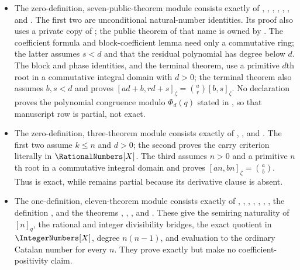 \documentclass[11pt,a4paper,oneside,openany]{book}
\theoremstyle{definition}
\theoremstyle{remark}
\newcommand{\statusexact}{\textsf{\color{statusgreen}exact}}
\newcommand{\statuspartial}{\textsf{\color{statusamber}partial}}
\begin{document}
\begin{itemize}
\item The zero-definition, seven-public-theorem module 
consists exactly of ,
,
,
,
,
, and
.  The first two are unconditional
natural-number identities.  Its proof also uses a private copy of
; the public theorem of that name is owned by
.  The coefficient formula and block-coefficient
lemma need only a commutative ring; the latter assumes $s<d$ and that the
residual polynomial has degree below $d$.  The block and phase identities,
and the terminal theorem, use a primitive $d$th root in a commutative
integral domain with $d>0$; the terminal theorem also assumes $b,s<d$ and
proves
$[ad+b,rd+s]_\zeta=\binom ar[b,s]_\zeta$.  No declaration proves the
polynomial congruence modulo $\Phi_d(q)$ stated in , so
that manuscript row is \statuspartial, not \statusexact.

\item The zero-definition, three-theorem module
 consists exactly of
,
, and
.  The first two assume
$k\le n$ and $d>0$; the second proves the carry criterion literally in
$\RationalNumbers[X]$.  The third assumes $n>0$ and a primitive $n$th root
in a commutative integral domain and proves
$[an,bn]_\zeta=\binom ab$.  Thus  is exact,
while  remains partial because its derivative
clause is absent.

\item The one-definition, eleven-theorem module 
consists exactly of ,
, ,
,
,
,
,
the definition , and the theorems
,
,
, and
.  These give the semiring naturality of
$[n]_q$, the rational and integer divisibility bridges, the exact quotient
in $\IntegerNumbers[X]$, degree $n(n-1)$, and evaluation to the ordinary
Catalan number for every $n$.  They prove  exactly but
make no coefficient-positivity claim.


\end{itemize}
\end{document}
